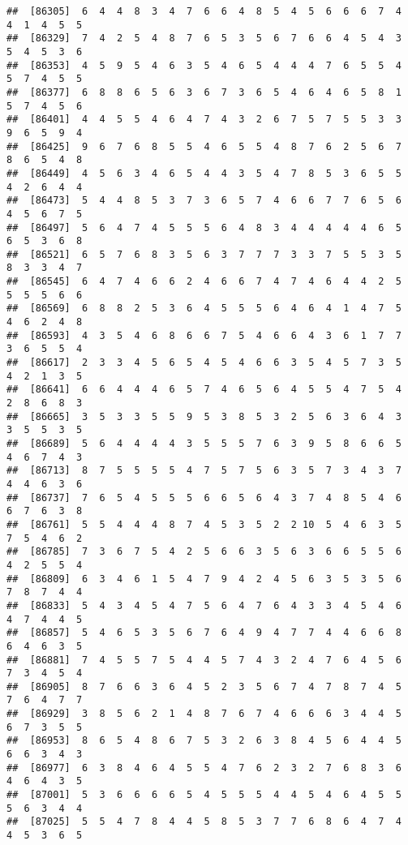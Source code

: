 \documentclass[
]{book}
\begin{document}
\begin{verbatim}
##  [86305]  6  4  4  8  3  4  7  6  6  4  8  5  4  5  6  6  6  7  4  4  1  4  5  5
##  [86329]  7  4  2  5  4  8  7  6  5  3  5  6  7  6  6  4  5  4  3  5  4  5  3  6
##  [86353]  4  5  9  5  4  6  3  5  4  6  5  4  4  4  7  6  5  5  4  5  7  4  5  5
##  [86377]  6  8  8  6  5  6  3  6  7  3  6  5  4  6  4  6  5  8  1  5  7  4  5  6
##  [86401]  4  4  5  5  4  6  4  7  4  3  2  6  7  5  7  5  5  3  3  9  6  5  9  4
##  [86425]  9  6  7  6  8  5  5  4  6  5  5  4  8  7  6  2  5  6  7  8  6  5  4  8
##  [86449]  4  5  6  3  4  6  5  4  4  3  5  4  7  8  5  3  6  5  5  4  2  6  4  4
##  [86473]  5  4  4  8  5  3  7  3  6  5  7  4  6  6  7  7  6  5  6  4  5  6  7  5
##  [86497]  5  6  4  7  4  5  5  5  6  4  8  3  4  4  4  4  4  6  5  6  5  3  6  8
##  [86521]  6  5  7  6  8  3  5  6  3  7  7  7  3  3  7  5  5  3  5  8  3  3  4  7
##  [86545]  6  4  7  4  6  6  2  4  6  6  7  4  7  4  6  4  4  2  5  5  5  5  6  6
##  [86569]  6  8  8  2  5  3  6  4  5  5  5  6  4  6  4  1  4  7  5  4  6  2  4  8
##  [86593]  4  3  5  4  6  8  6  6  7  5  4  6  6  4  3  6  1  7  7  3  6  5  5  4
##  [86617]  2  3  3  4  5  6  5  4  5  4  6  6  3  5  4  5  7  3  5  4  2  1  3  5
##  [86641]  6  6  4  4  4  6  5  7  4  6  5  6  4  5  5  4  7  5  4  2  8  6  8  3
##  [86665]  3  5  3  3  5  5  9  5  3  8  5  3  2  5  6  3  6  4  3  3  5  5  3  5
##  [86689]  5  6  4  4  4  4  3  5  5  5  7  6  3  9  5  8  6  6  5  4  6  7  4  3
##  [86713]  8  7  5  5  5  5  4  7  5  7  5  6  3  5  7  3  4  3  7  4  4  6  3  6
##  [86737]  7  6  5  4  5  5  5  6  6  5  6  4  3  7  4  8  5  4  6  6  7  6  3  8
##  [86761]  5  5  4  4  4  8  7  4  5  3  5  2  2 10  5  4  6  3  5  7  5  4  6  2
##  [86785]  7  3  6  7  5  4  2  5  6  6  3  5  6  3  6  6  5  5  6  4  2  5  5  4
##  [86809]  6  3  4  6  1  5  4  7  9  4  2  4  5  6  3  5  3  5  6  7  8  7  4  4
##  [86833]  5  4  3  4  5  4  7  5  6  4  7  6  4  3  3  4  5  4  6  4  7  4  4  5
##  [86857]  5  4  6  5  3  5  6  7  6  4  9  4  7  7  4  4  6  6  8  6  4  6  3  5
##  [86881]  7  4  5  5  7  5  4  4  5  7  4  3  2  4  7  6  4  5  6  7  3  4  5  4
##  [86905]  8  7  6  6  3  6  4  5  2  3  5  6  7  4  7  8  7  4  5  7  6  4  7  7
##  [86929]  3  8  5  6  2  1  4  8  7  6  7  4  6  6  6  3  4  4  5  6  7  3  5  5
##  [86953]  8  6  5  4  8  6  7  5  3  2  6  3  8  4  5  6  4  4  5  6  6  3  4  3
##  [86977]  6  3  8  4  6  4  5  5  4  7  6  2  3  2  7  6  8  3  6  4  6  4  3  5
##  [87001]  5  3  6  6  6  6  5  4  5  5  5  4  4  5  4  6  4  5  5  5  6  3  4  4
##  [87025]  5  5  4  7  8  4  4  5  8  5  3  7  7  6  8  6  4  7  4  4  5  3  6  5

\end{verbatim}
\end{document}
